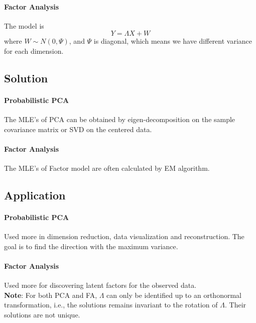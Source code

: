 \documentclass[12pt]{book}
\theoremstyle{definition}
\theoremstyle{remark}
\begin{document}
\paragraph{Factor Analysis}
The model is \[Y = \Lambda X+W\]
where $W\sim N(0,\Psi)$, and $\Psi$ is diagonal, which means we have different variance for each dimension.

\subsection{Solution}

\paragraph{Probabilistic PCA}
The MLE's of PCA can be obtained by eigen-decomposition on the sample covariance matrix or SVD on the centered data.

\paragraph{Factor Analysis}
The MLE's of Factor model are often calculated by EM algorithm.

\subsection{Application}

\paragraph{Probabilistic PCA}
Used more in dimension reduction, data visualization and reconstruction. The goal is to find the direction with the maximum variance.

\paragraph{Factor Analysis}
Used more for discovering latent factors for the observed data.\\



\textbf{Note}: For both PCA and FA, $\Lambda$ can only be identified up to an orthonormal transformation, i.e., the solutions remains invariant to the rotation of $\Lambda$. Their solutions are not unique.
\end{document}
